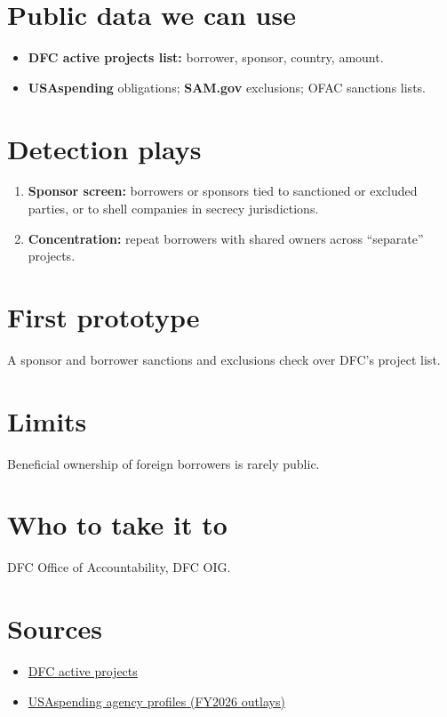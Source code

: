 \documentclass[letterpaper,11pt]{article}
\providecommand{\tightlist}{\setlength{\itemsep}{0pt}\setlength{\parskip}{0pt}}
\begin{document}
\hypertarget{public-data-we-can-use}{%
\section{Public data we can use}\label{public-data-we-can-use}}

\begin{itemize}
\tightlist
\item
  \textbf{DFC active projects list:} borrower, sponsor, country, amount.
\item
  \textbf{USAspending} obligations; \textbf{SAM.gov} exclusions; OFAC
  sanctions lists.
\end{itemize}

\hypertarget{detection-plays}{%
\section{Detection plays}\label{detection-plays}}

\begin{enumerate}
\def\labelenumi{\arabic{enumi}.}
\tightlist
\item
  \textbf{Sponsor screen:} borrowers or sponsors tied to sanctioned or
  excluded parties, or to shell companies in secrecy jurisdictions.
\item
  \textbf{Concentration:} repeat borrowers with shared owners across
  ``separate'' projects.
\end{enumerate}

\hypertarget{first-prototype}{%
\section{First prototype}\label{first-prototype}}

A sponsor and borrower sanctions and exclusions check over DFC's project
list.

\hypertarget{limits}{%
\section{Limits}\label{limits}}

Beneficial ownership of foreign borrowers is rarely public.

\hypertarget{who-to-take-it-to}{%
\section{Who to take it to}\label{who-to-take-it-to}}

DFC Office of Accountability, DFC OIG.

\hypertarget{sources}{%
\section{Sources}\label{sources}}

\begin{itemize}
\tightlist
\item
  \href{https://www.dfc.gov/what-we-do/active-projects}{DFC active
  projects}
\item
  \href{https://www.usaspending.gov/agency}{USAspending agency profiles
  (FY2026 outlays)}
\end{itemize}
\end{document}
